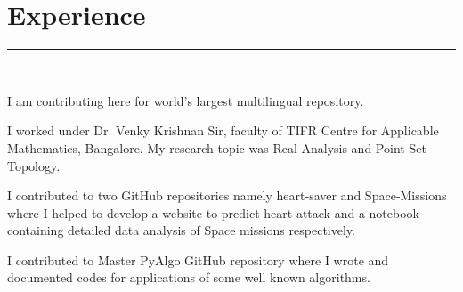 \documentclass[]{debjitpal-resume}
\begin{document}
\begin{minipage}[t]{0.6\textwidth}
\section{Experience}
\noindent\rule{12.5cm}{0.4pt}
 \\
\noindent
\hspace{4em}%
\begin{minipage}{0.85\textwidth\vspace{2pt}}
I am contributing here for world's largest multilingual repository.
\end{minipage}
\sectionsep
{} 
\noindent
\hspace{4em}%
\begin{minipage}{0.85\textwidth\vspace{2pt}}
I worked under Dr. Venky Krishnan Sir, faculty of TIFR Centre for Applicable Mathematics, Bangalore. My research topic was Real Analysis and Point Set Topology.\\
\end{minipage}
\sectionsep
{} 
\noindent
\hspace{4em}%
\begin{minipage}{0.85\textwidth\vspace{2pt}}
I contributed to two GitHub repositories namely heart‐saver and Space‐Missions where I helped to develop a website to predict heart attack and a notebook containing detailed data analysis of Space missions respectively.\\
\end{minipage}
\sectionsep
{} 
\noindent
\hspace{4em}%
\begin{minipage}{0.85\textwidth\vspace{2pt}}
I contributed to Master PyAlgo GitHub repository where I wrote and documented codes for applications of some well known algorithms.\\
\end{minipage}

\end{minipage}
\end{document}
